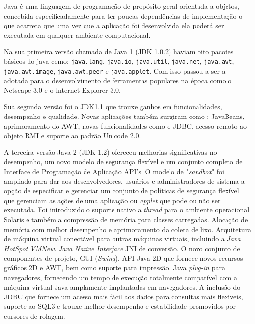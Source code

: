 Java é uma linguagem de programação de propósito geral orientada a objetos, concebida especificadamente para ter poucas dependências de implementação o que acarreta que uma vez que a aplicação foi desenvolvida ela poderá ser executada em qualquer ambiente computacional.

Na sua primeira versão chamada de Java 1 (\acs{JDK} 1.0.2) haviam oito pacotes básicos do java como: \texttt{java.lang}, \texttt{java.io}, \texttt{java.util}, \texttt{java.net}, \texttt{java.awt}, \texttt{java.awt.image}, \texttt{java.awt.peer} e \texttt{java.applet}. Com isso passou a ser a adotada para o desenvolvimento de ferramentas populares na época como o Netscape 3.0 e o Internet Explorer 3.0.

Sua segunda versão foi o \acs{JDK}1.1 \cite{JDK1.1} que trouxe ganhos em funcionalidades, desempenho e qualidade. Novas aplicações também surgiram como : JavaBeans, aprimoramento do \acs{AWT}, novas funcionalidades como o \acs{JDBC}, acesso remoto ao objeto \acs{RMI} e suporte ao padrão Unicode 2.0.

A terceira versão Java 2 (\acs{JDK} 1.2) ofereceu melhorias significativas no desempenho, um novo modelo de segurança flexível e um conjunto completo de Interface de Programação de Aplicação \acs{API}'s. O modelo de "\textit{sandbox}" foi ampliado para dar aos desenvolvedores, usuários e administradores de sistema a opção de especificar e gerenciar um conjunto de políticas de segurança flexível que gerenciam as ações de uma aplicação ou \textit{applet} que pode ou não ser executada. Foi introduzido o suporte nativo a \textit{thread} para o ambiente operacional Solaris e também a compressão de memória para classes carregadas. Alocação de memória com melhor desempenho e aprimoramento da coleta de lixo. Arquitetura de máquina virtual conectável para outras máquinas virtuais, incluindo a \textit{Java HotSpot VMNew}. \textit{Java Native Interface }\acs{JNI} de conversão. O novo conjunto de componentes de projeto, \acs{GUI} (\textit{Swing}). \acs{API} Java 2D que fornece novos recursos gráficos 2D e \acs{AWT}, bem como suporte para impressão. Java \textit{plug-in} para navegadores, fornecendo um tempo de execução totalmente compatível com a máquina virtual Java amplamente implantadas em navegadores. A inclusão do \acs{JDBC} que fornece um acesso mais fácil aos dados para consultas mais flexíveis, suporte ao SQL3 e trouxe melhor desempenho e estabilidade promovidos por cursores de rolagem.


